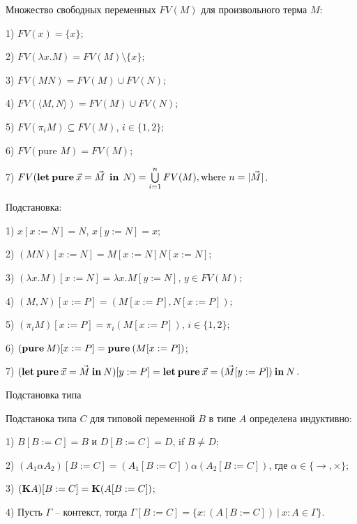 \begin{defin} Множество свободных переменных $FV(M)$ для произвольного терма $M$:

1) $FV(x) = \{ x \}$;

2) $FV(\lambda x. M) = FV(M) \setminus \{ x\}$;

3) $FV(M N) = FV(M) \cup FV(N);$

4) $FV(\langle M,N \rangle) = FV(M) \cup FV(N)$;

5) $FV(\pi_i M) \subseteq FV(M)$, $i \in \{ 1, 2\}$;

6) $FV(\text{pure } M) = FV(M)$;

7) $FV({\bf let \: pure} \: \vec{x} = \vec{M} \:\: {\bf in} \:\: N) = \bigcup \limits_{i = 1}^n FV(M), \text{where $n = |\vec{M}|$}$.
\end{defin}

\begin{defin} Подстановка:

1) $x [x := N] = N$, $x [y := N] = x$;

2) $(M N) [x := N] = M[x := N] N [x := N]$;

3) $(\lambda x. M) [x := N] = \lambda x. M [y := N]$, $y \in FV(M)$;

4) $(M, N)[x := P] = (M[x := P], N [x := P])$;

5) $(\pi_i M) [x := P] = \pi_i (M[x := P])$, $i \in \{ 1, 2\}$;

6) $({\bf pure \: } M) [x := P] = {\bf pure \: } (M [x := P])$;

7) $({\bf let \: pure \:}\vec{x} = \vec{M} {\: \bf in \:} N) [y := P] = {\bf let \: pure \:} \vec{x} = (\vec{M} [y := P]) {\: \bf in \:} N$.
\end{defin}

\begin{defin} Подстановка типа

  Подстанока типа $C$ для типовой переменной $B$ в типе $A$ определена индуктивно:

  1) $B [B := C] = B$ и $D [B := C] = D$, if $B \neq D$;

  2) $(A_1 \alpha A_2)[B := C] = (A_1[B := C]) \alpha (A_2[B := C])$, где $\alpha \in \{ \to, \times \}$;

  3) $({\bf K}A)[B := C] = {\bf K}(A [B := C])$;

  4) Пусть $\Gamma$ -- контекст, тогда $\Gamma [B := C] = \{ x : (A[B := C]) \: | \: x : A \in \Gamma \}$.
\end{defin}

